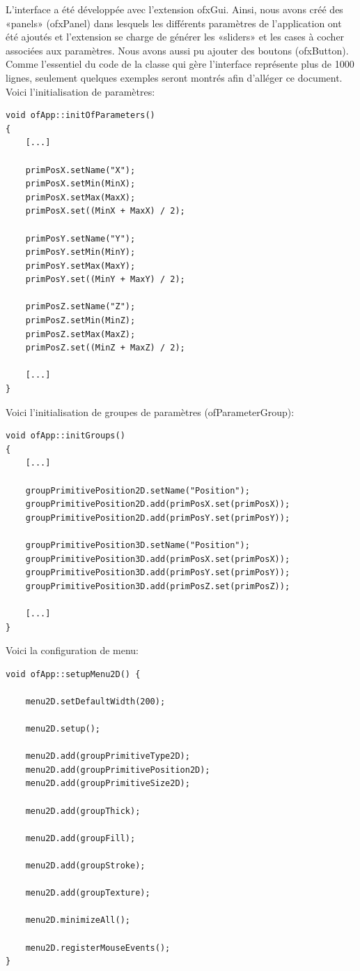 L'interface a été développée avec l'extension ofxGui. Ainsi, nous avons créé des «panels» (ofxPanel) dans lesquels les différents paramètres de l'application ont été ajoutés et l'extension se charge de générer les «sliders» et les cases à cocher associées aux paramètres. Nous avons aussi pu ajouter des boutons (ofxButton).\\

Comme l'essentiel du code de la classe qui gère l'interface représente plus de 1000 lignes, seulement quelques exemples seront montrés afin d'alléger ce document.\\

Voici l'initialisation de paramètres:
\begin{lstlisting}
void ofApp::initOfParameters() 
{
	[...]
	
	primPosX.setName("X");
	primPosX.setMin(MinX);
	primPosX.setMax(MaxX);
	primPosX.set((MinX + MaxX) / 2);
	
	primPosY.setName("Y");
	primPosY.setMin(MinY);
	primPosY.setMax(MaxY);
	primPosY.set((MinY + MaxY) / 2);
	
	primPosZ.setName("Z");
	primPosZ.setMin(MinZ);
	primPosZ.setMax(MaxZ);
	primPosZ.set((MinZ + MaxZ) / 2);
	
	[...]
}
\end{lstlisting}

Voici l'initialisation de groupes de paramètres (ofParameterGroup):
\begin{lstlisting}
void ofApp::initGroups()
{
	[...]
	
	groupPrimitivePosition2D.setName("Position");
	groupPrimitivePosition2D.add(primPosX.set(primPosX));
	groupPrimitivePosition2D.add(primPosY.set(primPosY));
	
	groupPrimitivePosition3D.setName("Position");
	groupPrimitivePosition3D.add(primPosX.set(primPosX));
	groupPrimitivePosition3D.add(primPosY.set(primPosY));
	groupPrimitivePosition3D.add(primPosZ.set(primPosZ));
	
	[...]
}
\end{lstlisting}

Voici la configuration de menu:
\begin{lstlisting}
void ofApp::setupMenu2D() {

	menu2D.setDefaultWidth(200);
	
	menu2D.setup();
	
	menu2D.add(groupPrimitiveType2D);
	menu2D.add(groupPrimitivePosition2D);
	menu2D.add(groupPrimitiveSize2D);
	
	menu2D.add(groupThick);
	
	menu2D.add(groupFill);
	
	menu2D.add(groupStroke);
	
	menu2D.add(groupTexture);
	
	menu2D.minimizeAll();
	
	menu2D.registerMouseEvents();
}
\end{lstlisting}

